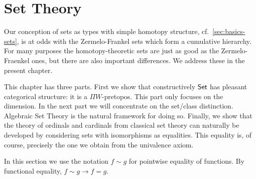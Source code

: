\chapter{Set Theory}
\label{cha:set-math}

Our conception of sets as types with simple homotopy structure, cf.\
\autoref{sec:basics-sets}, is at odds with the Zermelo-Frankel sets which form a
cumulative hierarchy. For many purposes the homotopy-theoretic sets are just as good as
the Zermelo-Fraenkel ones, but there are also important differences. We address these in
the present chapter. 

This chapter has three parts. First we show that constructively $\mathsf{Set}$ has pleasant categorical structure: it is a
$\Pi W$-pretopos. This part only focuses on the dimension. In the next part we will concentrate on the set/class distinction. Algebraic Set
Theory is the natural framework for doing so. Finally, we show that the theory of ordinals and cardinals from classical set theory can
naturally be developed by considering sets with isomorphisms as equalities. This equality is, of course, precisely the one we obtain from
the univalence axiom.

In this section we use the notation $f\sim g$ for pointwise equality of functions. By functional equality, $f\sim g\to f=g$.

